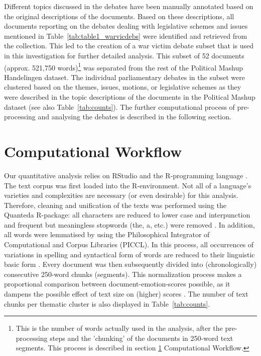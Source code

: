 \documentclass{dhbenelux}
\begin{document}
Different topics discussed in the debates have been manually annotated based on the original descriptions of the documents. Based on these descriptions, all documents reporting on the debates dealing with legislative schemes and issues mentioned in Table~\ref{tab:table1_warvicdebs} were identified and retrieved from the collection. This led to the creation of a war victim debate subset that is used in this investigation for further detailed analysis. This subset of 52 documents (approx. 521,750 words)\footnote{This is the number of words actually used in the analysis, after the pre-processing steps and the 'chunking' of the documents in 250-word text segments. This process is described in section \ref{sec:wf} Computational Workflow.} was separated from the rest of the Political Mashup Handelingen dataset. The individual parliamentary debates in the subset were clustered based on the themes, issues, motions, or legislative schemes as they were described in the topic descriptions of the documents in the Political Mashup dataset (see also Table~\ref{tab:counts}). The further computational process of pre-processing and analysing the debates is described in the following section.

\section{Computational Workflow}
\label{sec:wf}
Our quantitative analysis relies on RStudio and the R-programming language \citep{r_core_team_r_2019, rstudio_team_rstudio_2018}. The text corpus was first loaded into the R-environment. Not all of a language’s varieties and complexities are necessary (or even desirable) for this analysis. Therefore, cleaning and unification of the texts was performed using the Quanteda R-package: all characters are reduced to lower case and interpunction and frequent but meaningless stopwords (the, a, etc.) were removed \citep{benoit_quanteda:_2018}. In addition, all words were lemmatised by using the Philosophical Integrator of Computational and Corpus Libraries (PICCL). In this process, all occurrences of variations in spelling and syntactical form of words are reduced to their linguistic basic form \citep{reynaert_piccl:_2015}. Every document was then subsequently divided into (chronologically) consecutive 250-word chunks (segments). This normalization process makes a proportional comparison between document-emotion-scores possible, as it dampens the possible effect of text size on (higher) scores \citep{jockers_text_2016}. The number of text chunks per thematic cluster is also displayed in Table~\ref{tab:counts}.
\end{document}
